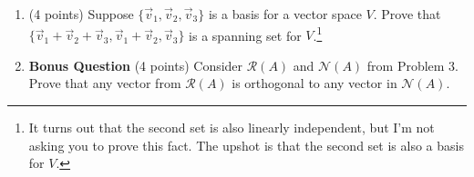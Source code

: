 \documentclass[11pt]{article}
\theoremstyle{definition}
\begin{document}
\begin{enumerate}
\item (4 points) Suppose $\{\vec{v}_1,\vec{v}_2,\vec{v}_3\}$ is a basis for a vector space $V$.  Prove that $\{\vec{v}_1+\vec{v}_2+\vec{v}_3, \vec{v}_1+\vec{v}_2,\vec{v}_3\}$ is a spanning set for $V$.\footnote{It turns out that the second set is also linearly independent, but I'm not asking you to prove this fact.  The upshot is that the second set is also a basis for $V$.}

\item \textbf{Bonus Question} (4 points) Consider $\mathcal{R}(A)$ and $\mathcal{N}(A)$ from Problem 3.  Prove that any vector from $\mathcal{R}(A)$ is orthogonal to any vector in $\mathcal{N}(A)$.

\end{enumerate}
\end{document}
